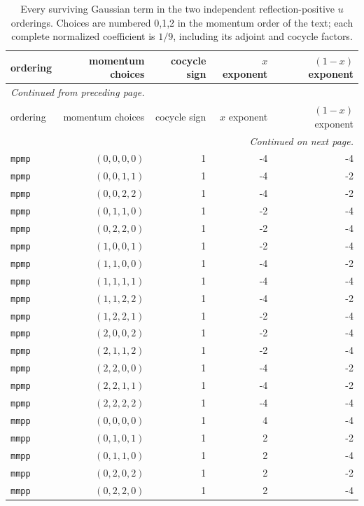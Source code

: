 \begingroup\small
\setlength{\tabcolsep}{5pt}
\begin{longtable}{lrrrr}
\caption{Every surviving Gaussian term in the two independent reflection-positive $u$ orderings. Choices are numbered 0,1,2 in the momentum order of the text; each complete normalized coefficient is $1/9$, including its adjoint and cocycle factors.}\label{expphysics:gaussian-terms}\\
\toprule
ordering & momentum choices & cocycle sign & $x$ exponent & $(1-x)$ exponent\\
\midrule
\endfirsthead
\multicolumn{5}{l}{\small\itshape Continued from preceding page.}\\
\toprule
ordering & momentum choices & cocycle sign & $x$ exponent & $(1-x)$ exponent\\
\midrule
\endhead
\midrule
\multicolumn{5}{r}{\small\itshape Continued on next page.}\\
\endfoot
\bottomrule
\endlastfoot
\texttt{mpmp} & $(0,0,0,0)$ & 1 & -4 & -4\\
\texttt{mpmp} & $(0,0,1,1)$ & 1 & -4 & -2\\
\texttt{mpmp} & $(0,0,2,2)$ & 1 & -4 & -2\\
\texttt{mpmp} & $(0,1,1,0)$ & 1 & -2 & -4\\
\texttt{mpmp} & $(0,2,2,0)$ & 1 & -2 & -4\\
\texttt{mpmp} & $(1,0,0,1)$ & 1 & -2 & -4\\
\texttt{mpmp} & $(1,1,0,0)$ & 1 & -4 & -2\\
\texttt{mpmp} & $(1,1,1,1)$ & 1 & -4 & -4\\
\texttt{mpmp} & $(1,1,2,2)$ & 1 & -4 & -2\\
\texttt{mpmp} & $(1,2,2,1)$ & 1 & -2 & -4\\
\texttt{mpmp} & $(2,0,0,2)$ & 1 & -2 & -4\\
\texttt{mpmp} & $(2,1,1,2)$ & 1 & -2 & -4\\
\texttt{mpmp} & $(2,2,0,0)$ & 1 & -4 & -2\\
\texttt{mpmp} & $(2,2,1,1)$ & 1 & -4 & -2\\
\texttt{mpmp} & $(2,2,2,2)$ & 1 & -4 & -4\\
\texttt{mmpp} & $(0,0,0,0)$ & 1 & 4 & -4\\
\texttt{mmpp} & $(0,1,0,1)$ & 1 & 2 & -2\\
\texttt{mmpp} & $(0,1,1,0)$ & 1 & 2 & -4\\
\texttt{mmpp} & $(0,2,0,2)$ & 1 & 2 & -2\\
\texttt{mmpp} & $(0,2,2,0)$ & 1 & 2 & -4\\

\end{longtable}
